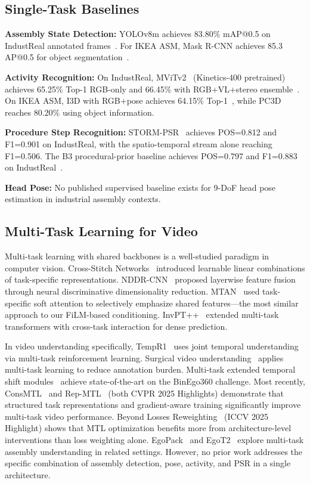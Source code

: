 \documentclass[10pt,twocolumn]{article}
\begin{document}
\subsection{Single-Task Baselines}

\textbf{Assembly State Detection:} YOLOv8m achieves 83.80\% mAP@0.5 on IndustReal annotated frames~\cite{schoonbeek2024industreal}. For IKEA ASM, Mask R-CNN achieves 85.3 AP@0.5 for object segmentation~\cite{benshabat2021ikea}.

\textbf{Activity Recognition:} On IndustReal, MViTv2~\cite{fan2022multiscale} (Kinetics-400 pretrained) achieves 65.25\% Top-1 RGB-only and 66.45\% with RGB+VL+stereo ensemble~\cite{schoonbeek2024industreal}. On IKEA ASM, I3D with RGB+pose achieves 64.15\% Top-1~\cite{benshabat2021ikea}, while PC3D~\cite{aganian2023ikea} reaches 80.20\% using object information.

\textbf{Procedure Step Recognition:} STORM-PSR~\cite{schoonbeek2025storm} achieves POS=0.812 and F1=0.901 on IndustReal, with the spatio-temporal stream alone reaching F1=0.506. The B3 procedural-prior baseline achieves POS=0.797 and F1=0.883 on IndustReal~\cite{schoonbeek2024industreal}.

\textbf{Head Pose:} No published supervised baseline exists for 9-DoF head pose estimation in industrial assembly contexts.

\subsection{Multi-Task Learning for Video}

Multi-task learning with shared backbones is a well-studied paradigm in computer vision. Cross-Stitch Networks~\cite{misra2016crossstitch} introduced learnable linear combinations of task-specific representations. NDDR-CNN~\cite{gao2019nddr} proposed layerwise feature fusion through neural discriminative dimensionality reduction. MTAN~\cite{liu2019mtan} used task-specific soft attention to selectively emphasize shared features---the most similar approach to our FiLM-based conditioning. InvPT++~\cite{ye2024invpt} extended multi-task transformers with cross-task interaction for dense prediction.

In video understanding specifically, TempR1~\cite{wu2025tempr1} uses joint temporal understanding via multi-task reinforcement learning. Surgical video understanding~\cite{kim2025surgical} applies multi-task learning to reduce annotation burden. Multi-task extended temporal shift modules~\cite{duong2025multitask} achieve state-of-the-art on the BinEgo360 challenge. Most recently, ConsMTL~\cite{zhang2025consmtl} and Rep-MTL~\cite{li2025repmtl} (both CVPR 2025 Highlights) demonstrate that structured task representations and gradient-aware training significantly improve multi-task video performance. Beyond Losses Reweighting~\cite{guo2025beyond} (ICCV 2025 Highlight) shows that MTL optimization benefits more from architecture-level interventions than loss weighting alone. EgoPack~\cite{egopack2025} and EgoT2~\cite{egot22025} explore multi-task assembly understanding in related settings. However, no prior work addresses the specific combination of assembly detection, pose, activity, and PSR in a single architecture.
\end{document}
